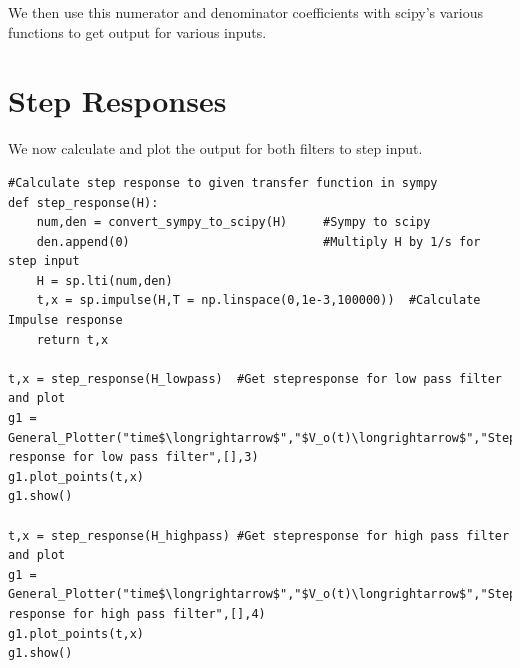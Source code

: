 \documentclass[11pt, a4paper]{article}
\begin{document}
We then use this numerator and denominator coefficients with scipy's various functions to get output for various inputs.

\section{Step Responses}
We now calculate and plot the output for both filters to step input.
\begin{lstlisting}
#Calculate step response to given transfer function in sympy
def step_response(H):
	num,den = convert_sympy_to_scipy(H)		#Sympy to scipy
	den.append(0)							#Multiply H by 1/s for step input
	H = sp.lti(num,den)
	t,x = sp.impulse(H,T = np.linspace(0,1e-3,100000))	#Calculate Impulse response
	return t,x

t,x = step_response(H_lowpass)	#Get stepresponse for low pass filter and plot
g1 = General_Plotter("time$\longrightarrow$","$V_o(t)\longrightarrow$","Step response for low pass filter",[],3)
g1.plot_points(t,x)
g1.show()

t,x = step_response(H_highpass)	#Get stepresponse for high pass filter and plot
g1 = General_Plotter("time$\longrightarrow$","$V_o(t)\longrightarrow$","Step response for high pass filter",[],4)
g1.plot_points(t,x)
g1.show()
\end{lstlisting}
\end{document}
